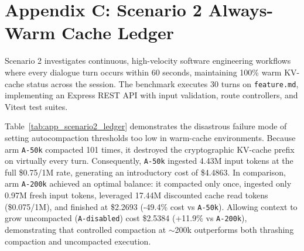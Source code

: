 \documentclass[10pt,twocolumn,a4paper]{article}
\begin{document}
\clearpage
\section*{Appendix C: Scenario 2 Always-Warm Cache Ledger}

Scenario 2 investigates continuous, high-velocity software engineering workflows where every dialogue turn occurs within 60 seconds, maintaining 100\% warm KV-cache status across the session. The benchmark executes 30 turns on \texttt{feature.md}, implementing an Express REST API with input validation, route controllers, and Vitest test suites.

Table~\ref{tab:app_scenario2_ledger} demonstrates the disastrous failure mode of setting autocompaction thresholds too low in warm-cache environments. Because arm \texttt{A-50k} compacted 101 times, it destroyed the cryptographic KV-cache prefix on virtually every turn. Consequently, \texttt{A-50k} ingested 4.43M input tokens at the full \$0.75/1M rate, generating an introductory cost of \$4.4863. In comparison, arm \texttt{A-200k} achieved an optimal balance: it compacted only once, ingested only 0.97M fresh input tokens, leveraged 17.44M discounted cache read tokens (\$0.075/1M), and finished at \$2.2693 (-49.4\% cost vs \texttt{A-50k}). Allowing context to grow uncompacted (\texttt{A-disabled}) cost \$2.5384 (+11.9\% vs \texttt{A-200k}), demonstrating that controlled compaction at $\sim$200k outperforms both thrashing compaction and uncompacted execution.
\end{document}
